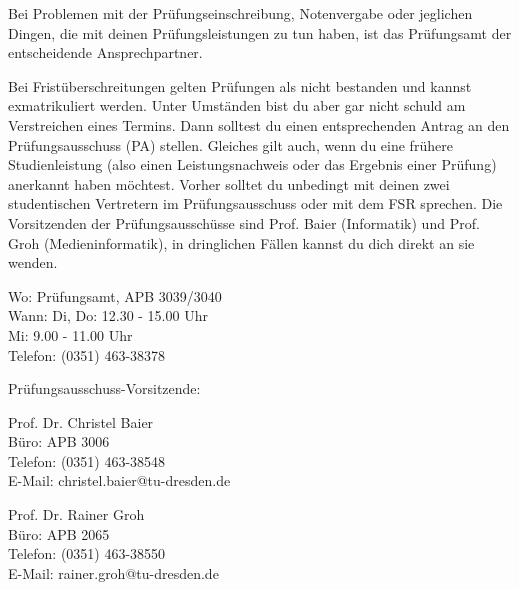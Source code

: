 Bei Problemen mit der Prüfungseinschreibung, Notenvergabe oder jeglichen Dingen, die mit deinen Prüfungsleistungen zu tun haben, ist das Prüfungsamt der entscheidende Ansprechpartner.

Bei Fristüberschreitungen gelten Prüfungen als nicht bestanden und kannst exmatrikuliert werden.
Unter Umständen bist du aber gar nicht schuld am Verstreichen eines Termins.
Dann solltest du einen entsprechenden Antrag an den Prüfungsausschuss (PA) stellen.
Gleiches gilt auch, wenn du eine frühere Studienleistung (also einen Leistungsnachweis oder das Ergebnis einer Prüfung) anerkannt haben möchtest.
Vorher solltet du unbedingt mit deinen zwei studentischen Vertretern im Prüfungsausschuss oder mit dem FSR sprechen.
Die Vorsitzenden der Prüfungsausschüsse sind Prof. Baier (Informatik) und Prof. Groh (Medieninformatik), in dringlichen Fällen kannst du dich direkt an sie wenden.

Wo: Prüfungsamt, APB 3039/3040 \\
Wann: Di, Do: 12.30 - 15.00 Uhr \\
Mi: 9.00 - 11.00 Uhr \\
Telefon: (0351) 463-38378

Prüfungsausschuss-Vorsitzende:

\begin{multicols}{2}
Prof. Dr. Christel Baier \\
Büro: APB 3006 \\
Telefon: (0351) 463-38548 \\
E-Mail: christel.baier@tu-dresden.de

Prof. Dr. Rainer Groh \\
Büro: APB 2065 \\
Telefon: (0351) 463-38550 \\
E-Mail: rainer.groh@tu-dresden.de
\end{multicols}
